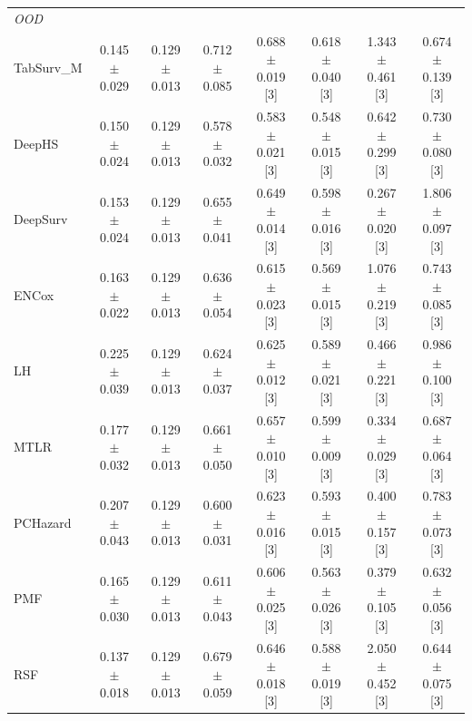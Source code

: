 \begin{table}[t]
\begin{tabular}{lccccccc}
\midrule
\multicolumn{8}{l}{\textit{OOD}} \\
TabSurv\_M & 0.145 $\pm$ 0.029 & 0.129 $\pm$ 0.013 & 0.712 $\pm$ 0.085 & 0.688 $\pm$ 0.019 [3] & 0.618 $\pm$ 0.040 [3] & 1.343 $\pm$ 0.461 [3] & 0.674 $\pm$ 0.139 [3] \\
DeepHS & 0.150 $\pm$ 0.024 & 0.129 $\pm$ 0.013 & 0.578 $\pm$ 0.032 & 0.583 $\pm$ 0.021 [3] & 0.548 $\pm$ 0.015 [3] & 0.642 $\pm$ 0.299 [3] & 0.730 $\pm$ 0.080 [3] \\
DeepSurv & 0.153 $\pm$ 0.024 & 0.129 $\pm$ 0.013 & 0.655 $\pm$ 0.041 & 0.649 $\pm$ 0.014 [3] & 0.598 $\pm$ 0.016 [3] & 0.267 $\pm$ 0.020 [3] & 1.806 $\pm$ 0.097 [3] \\
ENCox & 0.163 $\pm$ 0.022 & 0.129 $\pm$ 0.013 & 0.636 $\pm$ 0.054 & 0.615 $\pm$ 0.023 [3] & 0.569 $\pm$ 0.015 [3] & 1.076 $\pm$ 0.219 [3] & 0.743 $\pm$ 0.085 [3] \\
LH & 0.225 $\pm$ 0.039 & 0.129 $\pm$ 0.013 & 0.624 $\pm$ 0.037 & 0.625 $\pm$ 0.012 [3] & 0.589 $\pm$ 0.021 [3] & 0.466 $\pm$ 0.221 [3] & 0.986 $\pm$ 0.100 [3] \\
MTLR & 0.177 $\pm$ 0.032 & 0.129 $\pm$ 0.013 & 0.661 $\pm$ 0.050 & 0.657 $\pm$ 0.010 [3] & 0.599 $\pm$ 0.009 [3] & 0.334 $\pm$ 0.029 [3] & 0.687 $\pm$ 0.064 [3] \\
PCHazard & 0.207 $\pm$ 0.043 & 0.129 $\pm$ 0.013 & 0.600 $\pm$ 0.031 & 0.623 $\pm$ 0.016 [3] & 0.593 $\pm$ 0.015 [3] & 0.400 $\pm$ 0.157 [3] & 0.783 $\pm$ 0.073 [3] \\
PMF & 0.165 $\pm$ 0.030 & 0.129 $\pm$ 0.013 & 0.611 $\pm$ 0.043 & 0.606 $\pm$ 0.025 [3] & 0.563 $\pm$ 0.026 [3] & 0.379 $\pm$ 0.105 [3] & 0.632 $\pm$ 0.056 [3] \\
RSF & 0.137 $\pm$ 0.018 & 0.129 $\pm$ 0.013 & 0.679 $\pm$ 0.059 & 0.646 $\pm$ 0.018 [3] & 0.588 $\pm$ 0.019 [3] & 2.050 $\pm$ 0.452 [3] & 0.644 $\pm$ 0.075 [3] \\
\bottomrule
\end{tabular}
\end{table}
